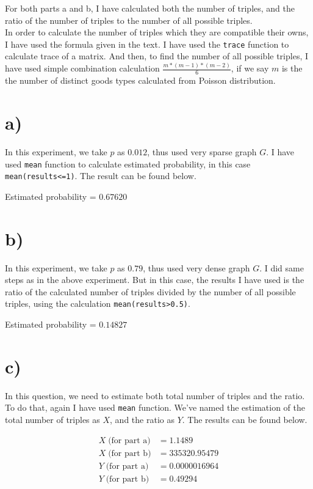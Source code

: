 \documentclass[12pt]{article}
\begin{document}
For both parts a and b, I have calculated both the number of triples, and the ratio of the number of triples to the number of all possible triples.
~ \\

In order to calculate the number of triples which they are compatible their owns, I have used the formula given in the text. I have used the \texttt{trace} function to calculate trace of a matrix. And then, to find the number of all possible triples, I have used simple combination calculation $\frac{m * (m-1) * (m-2)}{6}$, if we say $m$ is the the number of distinct goods types calculated from Poisson distribution.

\section*{a)}
    In this experiment, we take $p$ as $0.012$, thus used very sparse graph $G$. I have used \texttt{mean} function to calculate estimated probability, in this case \texttt{mean(results<=1)}. The result can be found below.
    
    \begin{center}
        Estimated probability = $0.67620$
    \end{center}
    
\section*{b)}
    In this experiment, we take $p$ as $0.79$, thus used very dense graph $G$. I did same steps as in the above experiment. But in this case, the results I have used is the ratio of the calculated number of triples divided by the number of all possible triples, using the calculation \texttt{mean(results>0.5)}.
    
    \begin{center}
        Estimated probability = $0.14827$
    \end{center}
    
\section*{c)}
    In this question, we need to estimate both total number of triples and the ratio. To do that, again I have used \texttt{mean} function. We've named the estimation of the total number of triples as $X$, and the ratio as $Y$. The results can be found below.
    
    \begin{align*}
        X \; \text{(for part a)} &=  1.1489 \\
        X \; \text{(for part b)} &=  335320.95479 \\
        Y \; \text{(for part a)} &=  0.0000016964 \\
        Y \; \text{(for part b)} &=  0.49294
    \end{align*}
\end{document}
